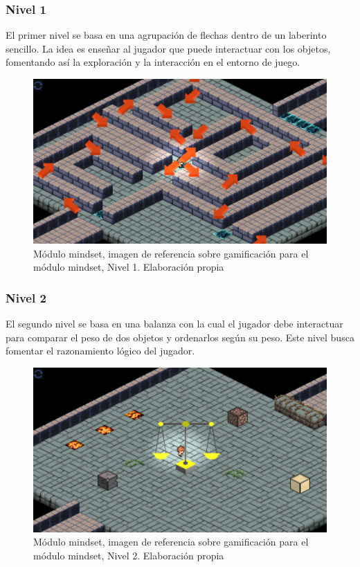 \subsubsection{Nivel 1}
El primer nivel se basa en una agrupación de flechas dentro de un laberinto sencillo. La idea es enseñar al jugador que puede interactuar con los objetos, fomentando así la exploración y la interacción en el entorno de juego.

\begin{figure}[H]
  \centering
  \includegraphics[width=0.7\linewidth]{Imagenes/Nivel1.png}
  \caption{Módulo mindset, imagen de referencia sobre gamificación para el módulo mindset, Nivel 1. Elaboración propia}
  \label{fig:imagen1mindset}
\end{figure}


\subsubsection{Nivel 2}

El segundo nivel se basa en una balanza con la cual el jugador debe interactuar para comparar el peso de dos objetos y ordenarlos según su peso. Este nivel busca fomentar el razonamiento lógico del jugador.

\begin{figure}[H]
  \centering
  \includegraphics[width=0.7\linewidth]{Imagenes/Nivel2.png}
  \caption{Módulo mindset, imagen de referencia sobre gamificación para el módulo mindset, Nivel 2. Elaboración propia}
  \label{fig:imagen1mindset}
\end{figure}

